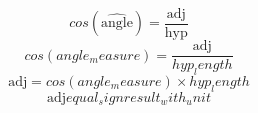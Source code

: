 \[cos(\widehat{{\text{{{angle}}}}})=\frac{{\text{{{adj}}}}}{{\text{{{hyp}}}}}\]
\[cos({angle_measure})=\frac{\text{{{adj}}}}{{{hyp_length}}}\]
\[\text{{{adj}}}=cos({angle_measure})\times {hyp_length}\]
\[\text{{{adj}}}{equal_sign}{result_with_unit}\]
